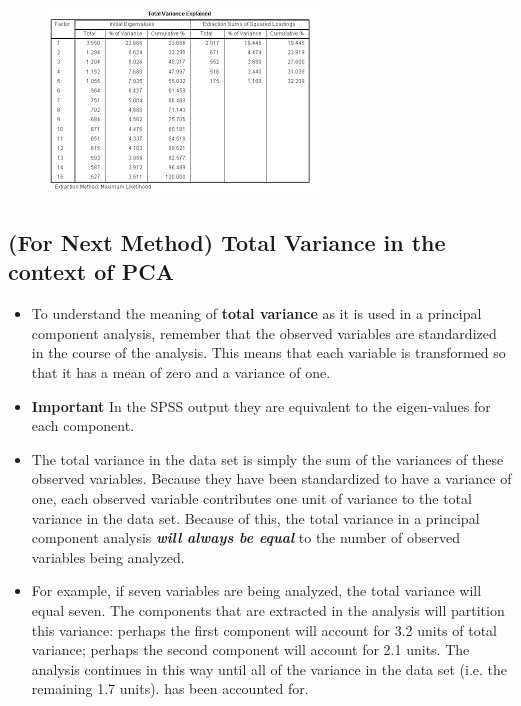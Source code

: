 \documentclass[a4paper,12pt]{article}
\begin{document}
\begin{figure}
\centering
\includegraphics[width=0.7\linewidth]{spss-eigen}
\end{figure}



\subsection{(For Next Method) Total Variance in the context of PCA}

\begin{itemize}
	\item To understand the meaning of \textbf{total
		variance} as it is used in a principal component analysis, remember that the observed
	variables are standardized in the course of the analysis.  This means that each variable is
	transformed so that it has a mean of zero and a variance of one.
	\item \textbf{Important} In the SPSS output they are equivalent to the eigen-values for each component.
	
\item 	The total variance in the
	data set is simply the sum of the variances of these observed variables.  Because they have
	been standardized to have a variance of one, each observed variable contributes one unit of
	variance to the total variance in the data set.  Because of this, the total variance in a
	principal component analysis \textbf{\emph{will always be equal}} to the number of observed variables
	being analyzed.
	
\item 	For example, if seven variables are being analyzed, the total variance will
	equal seven.  The components that are extracted in the analysis will partition this variance:
	perhaps the first component will account for 3.2 units of total variance; perhaps the second
	component will account for 2.1 units.  The analysis continues in this way until all of the
	variance in the data set (i.e. the remaining 1.7 units). has been accounted for.
\end{itemize}
\end{document}
